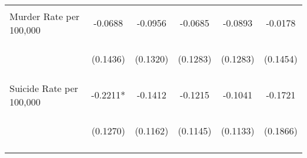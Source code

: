 \begin{center}
\begin{tabular}{lccccc}
\noalign{\smallskip}Murder Rate per 100,000 & \begin{scriptsize}-0.0688\end{scriptsize} & \begin{scriptsize}-0.0956\end{scriptsize} & \begin{scriptsize}-0.0685\end{scriptsize} & \begin{scriptsize}-0.0893\end{scriptsize} & \begin{scriptsize}-0.0178\end{scriptsize}\\
 & \begin{scriptsize}(0.1436)\end{scriptsize} & \begin{scriptsize}(0.1320)\end{scriptsize} & \begin{scriptsize}(0.1283)\end{scriptsize} & \begin{scriptsize}(0.1283)\end{scriptsize} & \begin{scriptsize}(0.1454)\end{scriptsize}\\
\noalign{\smallskip}Suicide Rate per 100,000 & \begin{scriptsize}-0.2211*\end{scriptsize} & \begin{scriptsize}-0.1412\end{scriptsize} & \begin{scriptsize}-0.1215\end{scriptsize} & \begin{scriptsize}-0.1041\end{scriptsize} & \begin{scriptsize}-0.1721\end{scriptsize}\\
 & \begin{scriptsize}(0.1270)\end{scriptsize} & \begin{scriptsize}(0.1162)\end{scriptsize} & \begin{scriptsize}(0.1145)\end{scriptsize} & \begin{scriptsize}(0.1133)\end{scriptsize} & \begin{scriptsize}(0.1866)\end{scriptsize}\\
\noalign{\smallskip}\hline\end{tabular}\\
\end{center}

